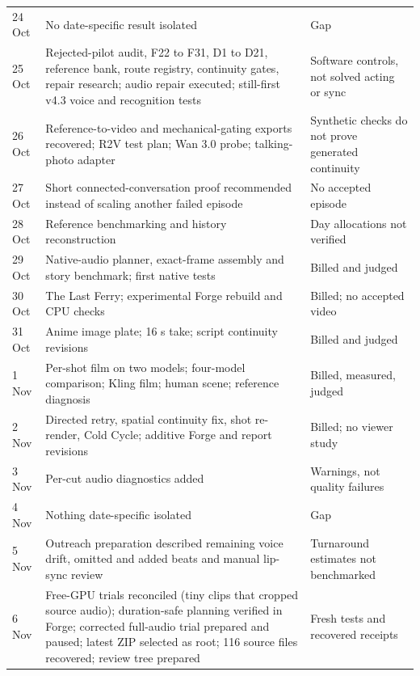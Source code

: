 \documentclass[11pt,a4paper]{article}
\begin{document}
\begin{longtable}{@{}P{1.8cm}P{8.2cm}P{5.5cm}@{}}
24 Oct & No date-specific result isolated & Gap\\
25 Oct & Rejected-pilot audit, F22 to F31, D1 to D21, reference bank, route registry, continuity gates, repair research; audio repair executed; still-first v4.3 voice and recognition tests & Software controls, not solved acting or sync\\
26 Oct & Reference-to-video and mechanical-gating exports recovered; R2V test plan; Wan 3.0 probe; talking-photo adapter & Synthetic checks do not prove generated continuity\\
27 Oct & Short connected-conversation proof recommended instead of scaling another failed episode & No accepted episode\\
28 Oct & Reference benchmarking and history reconstruction & Day allocations not verified\\
29 Oct & Native-audio planner, exact-frame assembly and story benchmark; first native tests & Billed and judged\\
30 Oct & The Last Ferry; experimental Forge rebuild and CPU checks & Billed; no accepted video\\
31 Oct & Anime image plate; 16 s take; script continuity revisions & Billed and judged\\
1 Nov & Per-shot film on two models; four-model comparison; Kling film; human scene; reference diagnosis & Billed, measured, judged\\
2 Nov & Directed retry, spatial continuity fix, shot re-render, Cold Cycle; additive Forge and report revisions & Billed; no viewer study\\
3 Nov & Per-cut audio diagnostics added & Warnings, not quality failures\\
4 Nov & Nothing date-specific isolated & Gap\\
5 Nov & Outreach preparation described remaining voice drift, omitted and added beats and manual lip-sync review & Turnaround estimates not benchmarked\\
6 Nov & Free-GPU trials reconciled (tiny clips that cropped source audio); duration-safe planning verified in Forge; corrected full-audio trial prepared and paused; latest ZIP selected as root; 116 source files recovered; review tree prepared & Fresh tests and recovered receipts\\
\bottomrule
\end{longtable}
\end{document}
